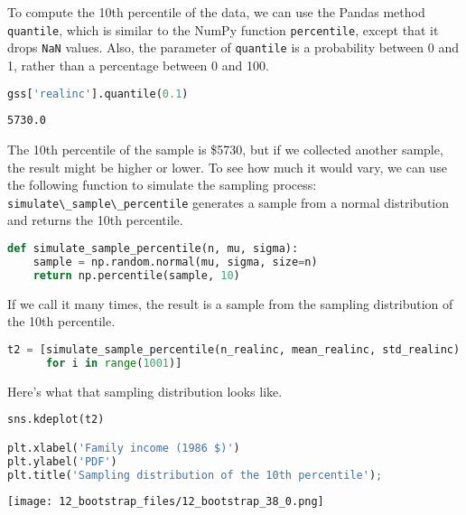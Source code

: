 To compute the 10th percentile of the data, we can use the Pandas method
\passthrough{\lstinline!quantile!}, which is similar to the NumPy
function \passthrough{\lstinline!percentile!}, except that it drops
\passthrough{\lstinline!NaN!} values. Also, the parameter of
\passthrough{\lstinline!quantile!} is a probability between 0 and 1,
rather than a percentage between 0 and 100.


\begin{lstlisting}[language=Python,style=source]
gss['realinc'].quantile(0.1)
\end{lstlisting}

\begin{lstlisting}[style=output]
5730.0
\end{lstlisting}

The 10th percentile of the sample is \$5730, but if we collected another
sample, the result might be higher or lower. To see how much it would
vary, we can use the following function to simulate the sampling
process: \passthrough{\lstinline!simulate\_sample\_percentile!}
generates a sample from a normal distribution and returns the 10th
percentile.

\begin{lstlisting}[language=Python,style=source]
def simulate_sample_percentile(n, mu, sigma):
    sample = np.random.normal(mu, sigma, size=n)
    return np.percentile(sample, 10)
\end{lstlisting}

If we call it many times, the result is a sample from the sampling
distribution of the 10th percentile.

\begin{lstlisting}[language=Python,style=source]
t2 = [simulate_sample_percentile(n_realinc, mean_realinc, std_realinc)
      for i in range(1001)]
\end{lstlisting}

Here's what that sampling distribution looks like.

\begin{lstlisting}[language=Python,style=source]
sns.kdeplot(t2)

plt.xlabel('Family income (1986 $)')
plt.ylabel('PDF')
plt.title('Sampling distribution of the 10th percentile');
\end{lstlisting}

\begin{center}
\texttt{[image: 12\_bootstrap\_files/12\_bootstrap\_38\_0.png]}
\end{center}


